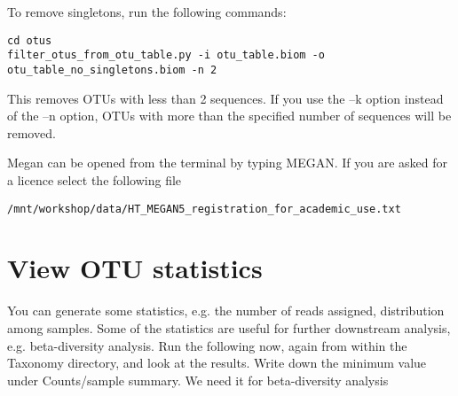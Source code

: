 \begin{steps}
To remove singletons, run the following commands:
\begin{lstlisting}
cd otus
filter_otus_from_otu_table.py -i otu_table.biom -o otu_table_no_singletons.biom -n 2
\end{lstlisting}
\end{steps}

\begin{note}
This removes OTUs with less than 2 sequences. If you use the –k option instead of the –n option, OTUs with more than the specified number of sequences will be removed.
\end{note}

\begin{steps}
Megan can be opened from the terminal by typing MEGAN. If you are asked for a licence select the following file 
\begin{lstlisting}
/mnt/workshop/data/HT_MEGAN5_registration_for_academic_use.txt 
\end{lstlisting}
\end{steps}


\section{View OTU statistics}

\begin{information}
You can generate some statistics, e.g. the number of reads assigned, distribution among samples. Some of the statistics are useful for further downstream analysis, e.g. beta-diversity analysis. Run the following now, again from within the Taxonomy directory, and look at the results. Write down the minimum value under Counts/sample summary. We need it for beta-diversity analysis
\end{information}

